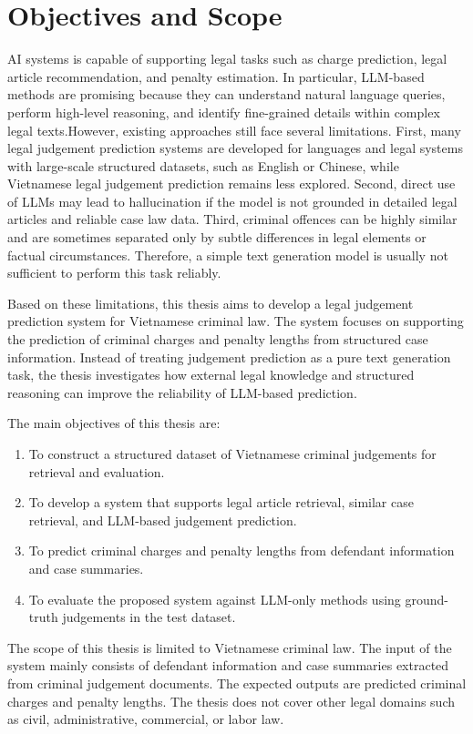 \documentclass[../main.tex]{subfiles}
\begin{document}
\section{Objectives and Scope } 
\label{sec:giaiphap}
AI systems is capable of supporting legal tasks such as charge prediction, legal article recommendation, and penalty estimation. In particular, LLM-based methods are promising because they can understand natural language queries, perform high-level reasoning, and identify fine-grained details within complex legal texts.However, existing approaches still face several limitations. First, many legal judgement prediction systems are developed for languages and legal systems with large-scale structured datasets, such as English or Chinese, while Vietnamese legal judgement prediction remains less explored. Second, direct use of LLMs may lead to hallucination if the model is not grounded in detailed legal articles and reliable case law data. Third, criminal offences can be highly similar and are sometimes separated only by subtle differences in legal elements or factual circumstances. Therefore, a simple text generation model is usually not sufficient to perform this task reliably.

Based on these limitations, this thesis aims to develop a legal judgement prediction system for Vietnamese criminal law. The system focuses on supporting the prediction of criminal charges and penalty lengths from structured case information. Instead of treating judgement prediction as a pure text generation task, the thesis investigates how external legal knowledge and structured reasoning can improve the reliability of LLM-based prediction.

The main objectives of this thesis are:

\begin{enumerate}
    \item To construct a structured dataset of Vietnamese criminal judgements for retrieval and evaluation.
    \item To develop a system that supports legal article retrieval, similar case retrieval, and LLM-based judgement prediction.
    \item To predict criminal charges and penalty lengths from defendant information and case summaries.
    \item To evaluate the proposed system against LLM-only methods using ground-truth judgements in the test dataset.
\end{enumerate}

The scope of this thesis is limited to Vietnamese criminal law. The input of the system mainly consists of defendant information and case summaries extracted from criminal judgement documents. The expected outputs are predicted criminal charges and penalty lengths. The thesis does not cover other legal domains such as civil, administrative, commercial, or labor law.
\end{document}
